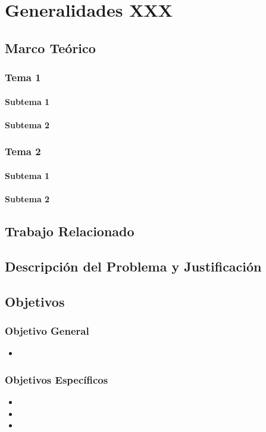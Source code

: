 \chapter{Generalidades XXX}

\section{Marco Teórico}

\subsection{Tema 1}
\subsubsection{Subtema 1}
\subsubsection{Subtema 2}

\subsection{Tema 2}
\subsubsection{Subtema 1}
\subsubsection{Subtema 2}

\section{Trabajo Relacionado}

\section{Descripción del Problema y Justificación}

\section{Objetivos}
\subsection{Objetivo General}
\begin{itemize}
\item 
\end{itemize}

\subsection{Objetivos Específicos}
\begin{itemize}
\item 
\item 
\item 
\end{itemize}


